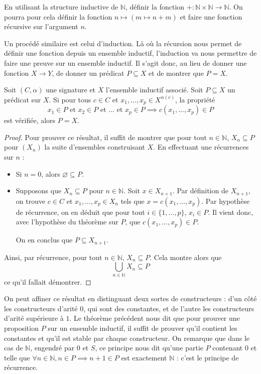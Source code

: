 \begin{exercise}
  En utilisant la structure inductive de $\mathbb N$, définir la fonction
  $+ : \mathbb N \times \mathbb N \to \mathbb N$. On pourra pour cela définir
  la fonction $n \mapsto (m \mapsto n + m)$ et faire une fonction récursive sur
  l'argument $n$.
\end{exercise}

Un procédé similaire est celui d'induction. Là où la récursion nous permet de
définir une fonction depuis un ensemble inductif, l'induction va nous permettre
de faire une preuve sur un ensemble inductif. Il s'agit donc, au lieu de donner
une fonction $X \to Y$, de donner un prédicat $P \subseteq X$ et de montrer que
$P = X$.

\begin{theorem}
  Soit $(C,\alpha)$ une signature et $X$ l'ensemble inductif associé. Soit
  $P\subseteq X$ un prédicat sur $X$. Si pour tous $c\in C$ et
  $x_1,\ldots,x_p\in X^{\alpha(c)}$, la propriété
  $$x_1\in P \text{ et } x_2\in P \text{ et }\ldots \text{ et }x_p\in P \implies
  c(x_1,\ldots,x_p)\in P$$ est vérifiée,
  alors $P = X$.
\end{theorem}

\begin{proof}
  Pour prouver ce résultat, il suffit de montrer que pour tout $n\in\mathbb N$,
  $X_n \subseteq P$ pour $(X_n)$ la suite d'ensembles construisant $X$. En
  effectuant une récurrences sur $n$ :
  \begin{itemize}
  \item Si $n = 0$, alors $\varnothing \subseteq P$.
  \item Supposons que $X_n \subseteq P$ pour $n \in \mathbb N$. Soit
    $x \in X_{n+1}$. Par définition de $X_{n+1}$, on trouve $c \in C$ et
    $x_1,\ldots,x_p \in X_n$ tels que $x = c(x_1,\ldots,x_p)$. Par hypothèse
    de récurrence, on en déduit que pour tout $i\in\{1,\ldots,p\}$, $x_i\in P$.
    Il vient donc, avec l'hypothèse du théorème sur $P$, que
    $c(x_1,\ldots,x_p)\in P$.

    On en conclus que $P\subseteq X_{n+1}$.
  \end{itemize}

  Ainsi, par récurrence, pour tout $n\in \mathbb N$, $X_n \subseteq P$.
  Cela montre alors que
  $$\bigcup_{n \in \mathbb N} X_n \subseteq P$$
  ce qu'il fallait démontrer.
\end{proof}

On peut affiner ce résultat en distinguant deux sortes de constructeurs : d'un
côté les constructeurs d'arité $0$, qui sont des constantes, et de l'autre les
constructeurs d'arité supérieure à $1$. Le théorème précédent nous dit que pour
prouver une proposition $P$ sur un ensemble inductif, il suffit de prouver qu'il
contient les constantes et qu'il est stable par chaque constructeur. On remarque
que dans le cas de $\mathbb N$, engendré par $0$ et $S$, ce principe nous dit
qu'une partie $P$ contenant $0$ et telle que
$\forall n\in\mathbb N, n\in P \implies n+1\in P$ est exactement $\mathbb N$ :
c'est le principe de récurrence.

